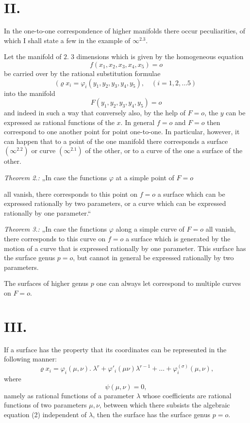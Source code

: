 \documentclass{article}
\begin{document}
\section*{II.}

In the one-to-one correspondence of higher manifolds there occur peculiarities, of which I shall state a few in the example of $\infty^{2.3}$.

Let the manifold of $2.\;3$ dimensions which is given by the homogeneous equation
\[ f(x_1, x_2, x_3, x_4, x_5) = o \]
be carried over by the rational substitution formulae
\[ (\varrho x_i = \varphi_i(y_1, y_2, y_3, y_4, y_5), \quad (i = 1, 2, \ldots 5) \]
into the manifold
\[ F(y_1, y_2, y_3, y_4, y_5) = o \]
and indeed in such a way that conversely also, by the help of $F = o$, the $y$ can be expressed as rational functions of the $x$. In general $f = o$ and $F = o$ then correspond to one another point for point one-to-one. In particular, however, it can happen that to a point of the one manifold there corresponds a surface $(\infty^{2.2})$ or curve $(\infty^{2.1})$ of the other, or to a curve of the one a surface of the other.

\emph{Theorem 2.:} „In case the functions $\varphi$ at a simple point of $F = o$

all vanish, there corresponds to this point on $f = o$ a surface which can be expressed rationally by two parameters, or a curve which can be expressed rationally by one parameter.“

\emph{Theorem 3.:} „In case the functions $\varphi$ along a simple curve of $F = o$ all vanish, there corresponds to this curve on $f = o$ a surface which is generated by the motion of a curve that is expressed rationally by one parameter. This surface has the surface genus $p = o$, but cannot in general be expressed rationally by two parameters.

The surfaces of higher genus $p$ one can always let correspond to multiple curves on $F = o$.

\section*{III.}

If a surface has the property that its coordinates can be represented in the following manner:
\[ \varrho x_i = \varphi_i(\mu,\nu).\; \lambda^{r} + \varphi'_i(\mu\nu) \lambda^{r-1} + \ldots + \varphi_i^{(\sigma)}(\mu,\nu), \tag{1} \]
where
\[ \psi(\mu,\nu) = 0, \tag{2} \]
namely as rational functions of a parameter $\lambda$ whose coefficients are rational functions of two parameters $\mu, \nu$, between which there subsists the algebraic equation (2) independent of $\lambda$, then the surface has the surface genus $p = o$.
\end{document}

